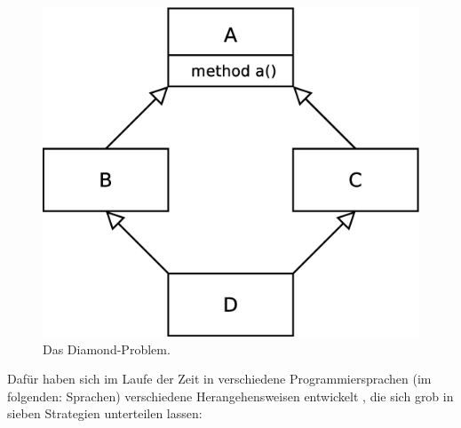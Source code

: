 \begin{figure}[h]
\centering
 \includegraphics[scale = 0.27]{pictures/diamond}
 \caption{Das Diamond-Problem.}
 \label{diamond}
\end{figure}

Dafür haben sich im Laufe der Zeit in verschiedene Programmiersprachen (im folgenden: Sprachen) verschiedene Herangehensweisen entwickelt \cite{wikipedia}, die sich grob in sieben Strategien unterteilen lassen:

